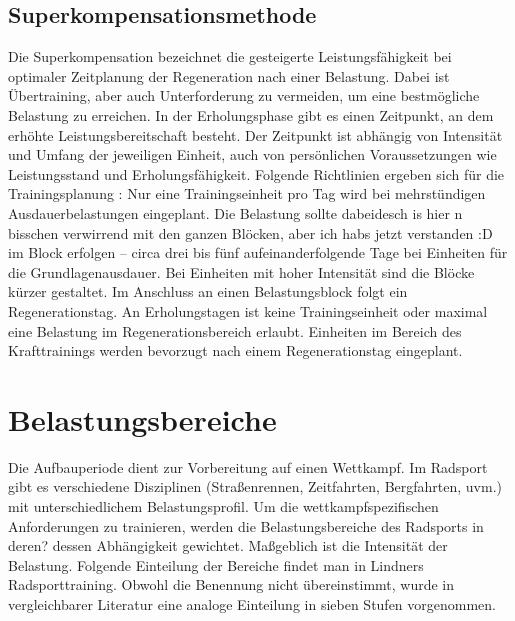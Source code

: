 \subsection{Superkompensationsmethode}
Die Superkompensation bezeichnet die gesteigerte Leistungsfähigkeit bei optimaler Zeitplanung der Regeneration nach einer Belastung. \cite[163]{Trainingswissenschaft} Dabei ist Übertraining, aber auch Unterforderung zu vermeiden, um eine bestmögliche Belastung zu erreichen. In der Erholungsphase gibt es einen Zeitpunkt, an dem erhöhte Leistungsbereitschaft besteht. Der Zeitpunkt ist abhängig von Intensität und Umfang der jeweiligen Einheit, auch von persönlichen Voraussetzungen wie Leistungsstand und Erholungsfähigkeit. \newline
Folgende Richtlinien ergeben sich für die Trainingsplanung \cite[44-46]{Radsporttraining}: Nur eine Trainingseinheit pro Tag wird bei mehrstündigen Ausdauerbelastungen eingeplant. Die Belastung sollte dabeidesch is hier n bisschen verwirrend mit den ganzen Blöcken, aber ich habs jetzt verstanden :D im Block erfolgen -- circa drei bis fünf aufeinanderfolgende Tage bei Einheiten für die Grundlagenausdauer. Bei Einheiten mit hoher Intensität sind die Blöcke kürzer gestaltet. Im Anschluss an einen Belastungsblock folgt ein Regenerationstag. An Erholungstagen ist keine Trainingseinheit oder maximal eine Belastung im Regenerationsbereich erlaubt. Einheiten im Bereich des Krafttrainings werden bevorzugt nach einem Regenerationstag eingeplant. \cite[60]{Radsporttraining}


\section{Belastungsbereiche}
\label{grundlagen:sport:belastungsbereiche}
 \newline
Die Aufbauperiode dient zur Vorbereitung auf einen Wettkampf. Im Radsport gibt es verschiedene Disziplinen (Straßenrennen, Zeitfahrten, Bergfahrten, uvm.) mit unterschiedlichem Belastungsprofil. Um die wettkampfspezifischen Anforderungen zu trainieren, werden die Belastungsbereiche des Radsports in deren? dessen Abhängigkeit gewichtet. Maßgeblich ist die Intensität der Belastung. Folgende Einteilung der Bereiche findet man in Lindners Radsporttraining. \cite[31-39]{Radsporttraining} Obwohl die Benennung nicht übereinstimmt, wurde in vergleichbarer Literatur \cite[27]{Ausdauertrainer} eine analoge Einteilung in sieben Stufen vorgenommen. 
